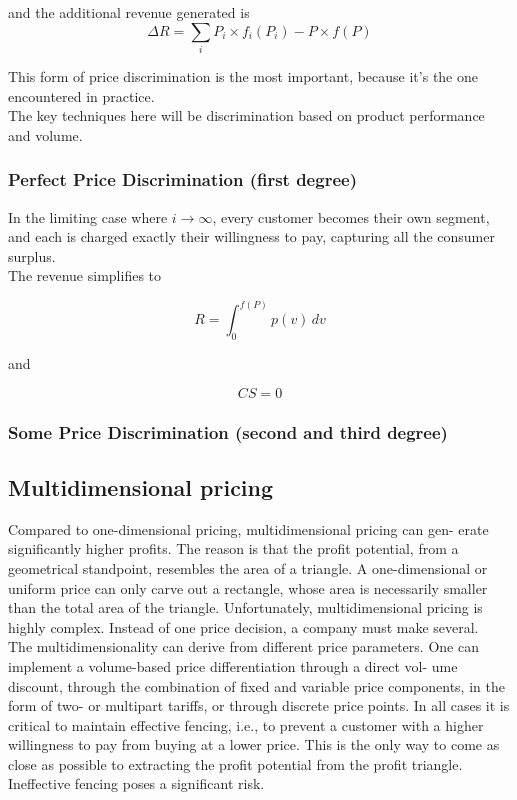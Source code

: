 \documentclass{article}
\begin{document}
and the additional revenue generated is 
\[
\Delta R = \sum_i P_i \times f_i(P_i) - P \times f(P) 
\]

This form of price discrimination is the most important, because it's the one encountered in practice. \\

The key techniques here will be discrimination based on product performance and volume.


\subsubsection{Perfect Price Discrimination (first degree)}
In the limiting case where $i \rightarrow \infty$, every customer becomes their own segment, and each is charged exactly their willingness to pay, capturing all the consumer surplus. \\

The revenue simplifies to

\[
R = \int_0^{f(P)} p(v) \, dv
\]

and

\[
CS = 0
\]


\subsubsection{Some Price Discrimination (second and third degree)}

\subsection{Multidimensional pricing}

Compared to one-dimensional pricing, multidimensional pricing can gen- erate significantly higher profits. The reason is that the profit potential, from a geometrical standpoint, resembles the area of a triangle. A one-dimensional or uniform price can only carve out a rectangle, whose area is necessarily smaller than the total area of the triangle. Unfortunately, multidimensional pricing is highly complex. Instead of one price decision, a company must make several. \\

The multidimensionality can derive from different price parameters. One can implement a volume-based price differentiation through a direct vol- ume discount, through the combination of fixed and variable price components, in the form of two- or multipart tariffs, or through discrete price points. In all cases it is critical to maintain effective fencing, i.e., to prevent a customer with a higher willingness to pay from buying at a lower price. This is the only way to come as close as possible to extracting the profit potential from the profit triangle. Ineffective fencing poses a significant risk. \\
\end{document}
